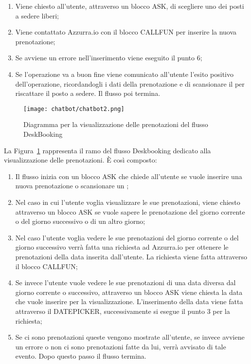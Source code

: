\begin{enumerate}
	\item Viene chiesto all'utente, attraverso un blocco ASK, di scegliere uno dei posti a sedere liberi;
	\item Viene contattato Azzurra.io con il blocco CALLFUN per inserire la nuova prenotazione;
	\item Se avviene un errore nell'inserimento viene eseguito il punto 6;
	\item Se l'operazione va a buon fine viene comunicato all'utente l'esito positivo dell'operazione, ricordandogli i dati della prenotazione e di scansionare il  per riscattare il posto a sedere. Il flusso poi termina.
\end{enumerate}

\begin{figure}[h]
	\centering
	\texttt{[image: chatbot/chatbot2.png]}
	\caption{Diagramma per la visualizzazione delle prenotazioni del flusso DeskBooking}\label{fig:vis}
\end{figure}

La Figura~\ref{fig:vis} rappresenta il ramo del flusso Deskbooking dedicato alla visualizzazione delle prenotazioni. È così composto:
\begin{enumerate}
	\item Il flusso inizia con un blocco ASK che chiede all'utente se vuole inserire una nuova prenotazione o scansionare un ;
	\item Nel caso in cui l'utente voglia visualizzare le sue prenotazioni, viene chiesto attraverso un blocco ASK se vuole sapere le prenotazione del giorno corrente o del giorno successivo o di un altro giorno;
	\item Nel caso l'utente voglia vedere le sue prenotazioni del giorno corrente o del giorno successivo verrà fatta una richiesta ad Azzurra.io per ottenere le prenotazioni della data inserita dall'utente. La richiesta viene fatta attraverso il blocco CALLFUN;
	\item Se invece l'utente vuole vedere le sue prenotazioni di una data diversa dal giorno corrente o successivo, attraverso un blocco ASK viene chiesta la data che vuole inserire per la visualizzazione. L'inserimento della data viene fatta attraverso il DATEPICKER, successivamente si esegue il punto 3 per la richiesta;
	\item Se ci sono prenotazioni queste vengono mostrate all'utente, se invece avviene un errore o non ci sono prenotazioni fatte da lui, verrà avvisato di tale evento. Dopo questo passo il flusso termina.\\
\end{enumerate}

